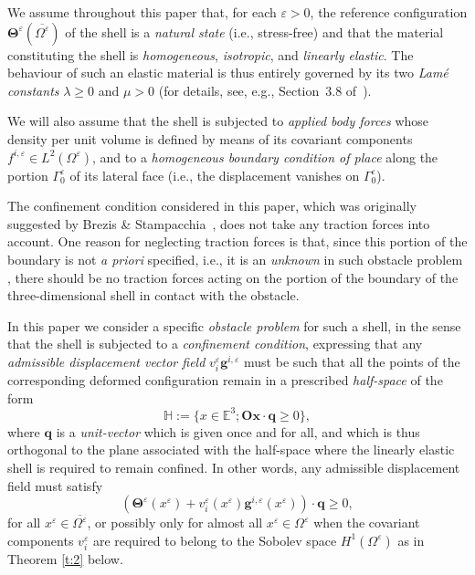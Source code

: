 \documentclass{amsart}
\begin{document}
We assume throughout this paper that, for each $\varepsilon > 0$, the reference configuration $\bm{\Theta}^\varepsilon(\overline{\Omega^\varepsilon})$ of the shell is a \emph{natural state} (i.e., stress-free) and that the material constituting the shell is \emph{homogeneous}, \emph{isotropic}, and \emph{linearly elastic}. The behaviour of such an elastic material is thus entirely governed by its two \emph{Lam\'{e} constants} $\lambda \ge 0$ and $\mu > 0$ (for details, see, e.g., Section~3.8 of~\cite{Ciarlet1988}).

We will also assume that the shell is subjected to \emph{applied body forces} whose density per unit volume is defined by means of its covariant components $f^{i, \varepsilon} \in L^2(\Omega^\varepsilon)$, and to a \emph{homogeneous boundary condition of place} along the portion $\Gamma^\varepsilon_0$ of its lateral face (i.e., the displacement vanishes on $\Gamma^\varepsilon_0$).

The confinement condition considered in this paper, which was originally suggested by Brezis \& Stampacchia~\cite{BrezisStampacchia1968}, does not take any traction forces into account. One reason for neglecting traction forces is that, since this portion of the boundary is not \emph{a priori} specified, i.e., it is an \emph{unknown} in such obstacle problem , there should be no traction forces acting on the portion of the boundary of the three-dimensional shell in contact with the obstacle.

In this paper we consider a specific \emph{obstacle problem} for such a shell, in the sense that the shell is subjected to a \emph{confinement condition}, expressing that any \emph{admissible displacement vector field} $v^\varepsilon_i \bm{g}^{i, \varepsilon}$ must be such that all the points of the corresponding deformed configuration remain in a prescribed \emph{half-space} of the form
$$
\mathbb{H}:=\{x\in\mathbb{E}^3;\boldsymbol{Ox}\cdot\bm{q}\ge 0\},
$$
where $\bm{q}$ is a \emph{unit-vector} which is given once and for all, and which is thus orthogonal to the plane associated with the half-space where the linearly elastic shell is required to remain confined.
In other words, any admissible displacement field must satisfy
\begin{equation}
	\label{cc-original}
	\left(\bm{\Theta}^\varepsilon(x^\varepsilon)+v^\varepsilon_i(x^\varepsilon)\bm{g}^{i,\varepsilon}(x^\varepsilon)\right)\cdot\bm{q}\ge 0,
\end{equation}
for all $x^\varepsilon \in \overline{\Omega^\varepsilon}$, or possibly only for almost all $x^\varepsilon \in \Omega^\varepsilon$ when the covariant components $v^\varepsilon_i$ are required to belong to the Sobolev space $H^1(\Omega^\varepsilon)$ as in Theorem \ref{t:2} below.
\end{document}
